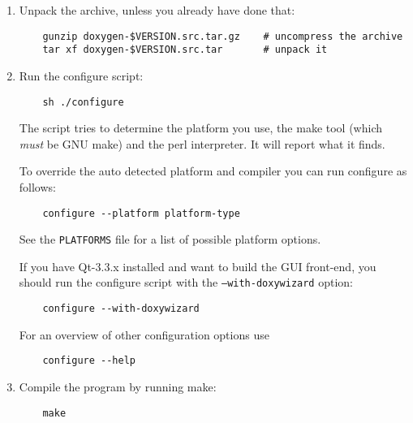 \begin{enumerate}
\item Unpack the archive, unless you already have done that:



\footnotesize\begin{verbatim}
    gunzip doxygen-$VERSION.src.tar.gz    # uncompress the archive
    tar xf doxygen-$VERSION.src.tar       # unpack it
\end{verbatim}
\normalsize


\item Run the configure script:



\footnotesize\begin{verbatim}
    sh ./configure
\end{verbatim}
\normalsize


The script tries to determine the platform you use, the make tool (which {\em must\/} be GNU make) and the perl interpreter. It will report what it finds.

To override the auto detected platform and compiler you can run configure as follows:



\footnotesize\begin{verbatim}
    configure --platform platform-type
\end{verbatim}
\normalsize


See the {\tt PLATFORMS} file for a list of possible platform options.

If you have Qt-3.3.x installed and want to build the GUI front-end, you should run the configure script with the {\tt --with-doxywizard} option:



\footnotesize\begin{verbatim}
    configure --with-doxywizard
\end{verbatim}
\normalsize


For an overview of other configuration options use



\footnotesize\begin{verbatim}
    configure --help
\end{verbatim}
\normalsize


\item Compile the program by running make:



\footnotesize\begin{verbatim}
    make
\end{verbatim}
\normalsize



\end{enumerate}
